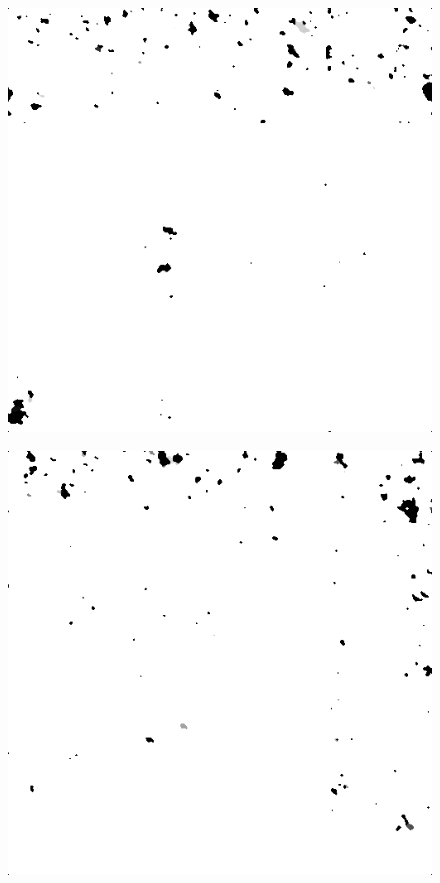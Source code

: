 \begin{figure}[H]
\begin{minipage}[t]{0.3\linewidth}
	\label{fig:car_m5}
\end{minipage}
\begin{minipage}[t]{0.3\linewidth} %
	\includegraphics[width = 1\linewidth]{gfx/hus/hus_m5.png}
	\label{fig:hus_m5}
\end{minipage}
\begin{minipage}[t]{0.3\linewidth} %
	\includegraphics[width = 1\linewidth]{gfx/sit/sit_m5.png}

\end{minipage}
\end{figure}
